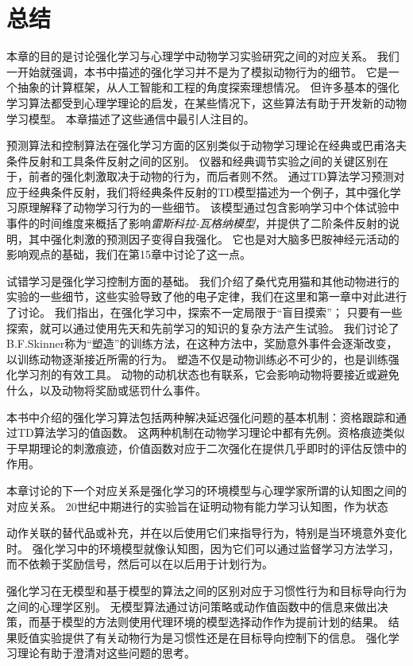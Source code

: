 {{{{{{{{{{{{{\section{总结}

本章的目的是讨论强化学习与心理学中动物学习实验研究之间的对应关系。
我们一开始就强调，本书中描述的强化学习并不是为了模拟动物行为的细节。
它是一个抽象的计算框架，从人工智能和工程的角度探索理想情况。
但许多基本的强化学习算法都受到心理学理论的启发，在某些情况下，这些算法有助于开发新的动物学习模型。
本章描述了这些通信中最引人注目的。


预测算法和控制算法在强化学习方面的区别类似于动物学习理论在经典或巴甫洛夫条件反射和工具条件反射之间的区别。
仪器和经典调节实验之间的关键区别在于，前者的强化刺激取决于动物的行为，而后者则不然。
通过TD算法学习预测对应于经典条件反射，我们将经典条件反射的TD模型描述为一个例子，其中强化学习原理解释了动物学习行为的一些细节。
该模型通过包含影响学习中个体试验中事件的时间维度来概括了影响\textit{雷斯科拉-瓦格纳模型}，并提供了二阶条件反射的说明，其中强化刺激的预测因子变得自我强化。
它也是对大脑多巴胺神经元活动的影响观点的基础，我们在第15章中讨论了这一点。


试错学习是强化学习控制方面的基础。
我们介绍了桑代克用猫和其他动物进行的实验的一些细节，这些实验导致了他的电子定律，我们在这里和第一章中对此进行了讨论。
我们指出，在强化学习中，探索不一定局限于“盲目摸索”；
只要有一些探索，就可以通过使用先天和先前学习的知识的复杂方法产生试验。
我们讨论了B.F.Skinner称为“塑造”的训练方法，在这种方法中，奖励意外事件会逐渐改变，以训练动物逐渐接近所需的行为。
塑造不仅是动物训练必不可少的，也是训练强化学习剂的有效工具。
动物的动机状态也有联系，它会影响动物将要接近或避免什么，以及动物将奖励或惩罚什么事件。


本书中介绍的强化学习算法包括两种解决延迟强化问题的基本机制：资格跟踪和通过TD算法学习的值函数。
这两种机制在动物学习理论中都有先例。资格痕迹类似于早期理论的刺激痕迹，价值函数对应于二次强化在提供几乎即时的评估反馈中的作用。


本章讨论的下一个对应关系是强化学习的环境模型与心理学家所谓的认知图之间的对应关系。
20世纪中期进行的实验旨在证明动物有能力学习认知图，作为状态{动作关联的替代品或补充，并在以后使用它们来指导行为，特别是当环境意外变化时。
强化学习中的环境模型就像认知图，因为它们可以通过监督学习方法学习，而不依赖于奖励信号，然后可以在以后用于计划行为。


强化学习在无模型和基于模型的算法之间的区别对应于习惯性行为和目标导向行为之间的心理学区别。
无模型算法通过访问策略或动作值函数中的信息来做出决策，而基于模型的方法则使用代理环境的模型选择动作作为提前计划的结果。
结果贬值实验提供了有关动物行为是习惯性还是在目标导向控制下的信息。
强化学习理论有助于澄清对这些问题的思考。


}}}}}}}}}}}}}}
